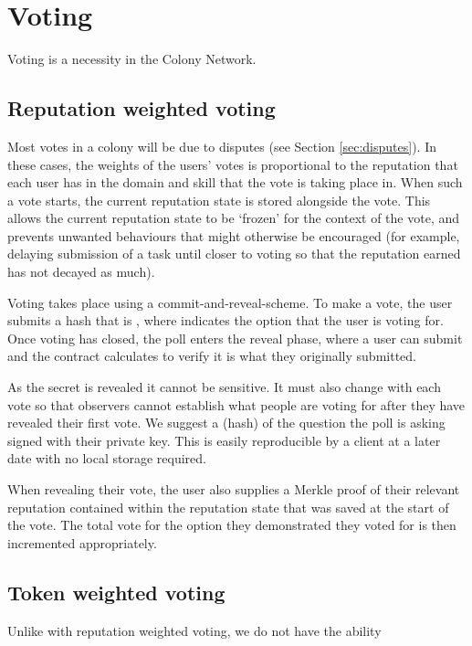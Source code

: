 \section{Voting}\label{sec:voting}
Voting is a necessity in the Colony Network. 

\subsection{Reputation weighted voting}
Most votes in a colony will be due to disputes (see Section \ref{sec:disputes}). In these cases, the weights of the users' votes is proportional to the reputation that each user has in the domain and skill that the vote is taking place in. When such a vote starts, the current reputation state is stored alongside the vote. This allows the current reputation state to be `frozen' for the context of the vote, and prevents unwanted behaviours that might otherwise be encouraged (for example, delaying submission of a task until closer to voting so that the reputation earned has not decayed as much).

Voting takes place using a commit-and-reveal-scheme. To make a vote, the user submits a hash that is , where  indicates the option that the user is voting for. Once voting has closed, the poll enters the reveal phase, where a user can submit  and the contract calculates  to verify it is what they originally submitted.

As the secret is revealed it cannot be sensitive. It must also change with each vote so that observers cannot establish what people are voting for after they have revealed their first vote. We suggest a (hash) of the question the poll is asking signed with their private key. This is easily reproducible by a client at a later date with no local storage required.

When revealing their vote, the user also supplies a Merkle proof of their relevant reputation contained within the reputation state that was saved at the start of the vote. The total vote for the option they demonstrated they voted for is then incremented appropriately.

\subsection{Token weighted voting}
Unlike with reputation weighted voting, we do not have the ability 


